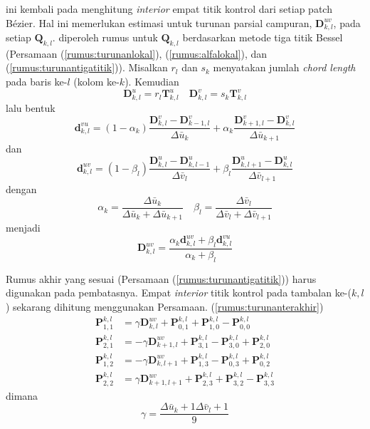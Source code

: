 ini kembali pada menghitung \textit{interior} empat 
titik kontrol dari setiap patch Bézier. Hal ini memerlukan 
estimasi untuk turunan parsial campuran, $\textbf{D}_{k,l}^{uv}$, 
pada setiap $\textbf{Q}_{k,l}$. diperoleh 
rumus untuk $\textbf{Q}_{k,l}$ berdasarkan metode 
tiga titik Bessel (Persamaan (\ref{rumus:turunanlokal}), 
(\ref{rumus:alfalokal}), dan (\ref{rumus:turunantigatitik})). 
Misalkan $r_l$ dan $s_k$ menyatakan jumlah \textit{chord length} 
pada baris ke-$l$ (kolom ke-$k$). Kemudian
\begin{equation}
	\textbf{D}_{k,l}^u = r_l \textbf{T}_{k,l}^u \quad
	\textbf{D}_{k,l}^v = s_k \textbf{T}_{k,l}^v 
\end{equation}
lalu bentuk \[\textbf{d}_{k,l}^{vu} = 
(1-\alpha_k)\frac{\textbf{D}_{k,l}^v - \textbf{D}_{k-1,l}^v}
{\Delta\bar{u}_k} + \alpha_k \frac{\textbf{D}_{k+1,l}^v - 
\textbf{D}_{k,l}^v}{\Delta\bar{u}_{k+1}} \]
dan \[\textbf{d}_{k,l}^{uv} = 
(1-\beta_l)\frac{\textbf{D}_{k,l}^u - \textbf{D}_{k,l-1}^u}
{\Delta\bar{v}_l} + \beta_l \frac{\textbf{D}_{k,l+1}^u - 
\textbf{D}_{k,l}^u}{\Delta\bar{v}_{l+1}} \]
dengan \[\alpha_k = \frac{\Delta\bar{u}_k}
{\Delta\bar{u}_k + \Delta\bar{u}_{k+1}} \quad
\beta_l = \frac{\Delta\bar{v}_l}
{\Delta\bar{v}_l + \Delta\bar{v}_{l+1}}\]
menjadi
\begin{equation}
	\textbf{D}_{k,l}^{uv} = \frac{\alpha_k \textbf{d}_{k,l}^{uv} +
	\beta_l \textbf{d}_{k,l}^{vu}}{\alpha_k + \beta_l}
	\label{rumus:turunanterakhir}
\end{equation}

Rumus akhir yang sesuai (Persamaan (\ref{rumus:turunantigatitik})) 
harus digunakan pada pembatasnya. Empat \textit{interior} 
titik kontrol pada tambalan ke-($k, l$) sekarang 
dihitung menggunakan Persamaan. (\ref{rumus:turunanterakhir})
\begin{equation}
	\begin{split}
		\textbf{P}_{1,1}^{k,l} &= \gamma\textbf{D}_{k,l}^{uv} + 
		\textbf{P}_{0,1}^{k,l} + \textbf{P}_{1,0}^{k,l} -
		\textbf{P}_{0,0}^{k,l} \\%
		\textbf{P}_{2,1}^{k,l} &= -\gamma\textbf{D}_{k+1,l}^{uv} + 
		\textbf{P}_{3,1}^{k,l} - \textbf{P}_{3,0}^{k,l} + 
		\textbf{P}_{2,0}^{k,l} \\%
		\textbf{P}_{1,2}^{k,l} &= -\gamma\textbf{D}_{k,l+1}^{uv} + 
		\textbf{P}_{1,3}^{k,l} - \textbf{P}_{0,3}^{k,l} + 
		\textbf{P}_{0,2}^{k,l} \\%
		\textbf{P}_{2,2}^{k,l} &= \gamma\textbf{D}_{k+1,l+1}^{uv} + 
		\textbf{P}_{2,3}^{k,l} + \textbf{P}_{3,2}^{k,l} -
		\textbf{P}_{3,3}^{k,l} %
	\end{split}
\end{equation}
dimana \[\gamma = \frac{\Delta\bar{u}_k+1
\Delta\bar{v}_l+1}{9}\]

